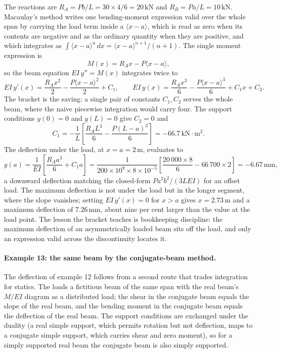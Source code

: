 The reactions are $R_A = Pb/L = 30 \times 4/6 = 20\,\text{kN}$ and
$R_B = Pa/L = 10\,\text{kN}$. Macaulay's method writes one bending-moment
expression valid over the whole span by carrying the load term inside a
 $\langle x - a\rangle$, which is read as zero
when its contents are negative and as the ordinary quantity when they are
positive, and which integrates as $\int \langle x - a\rangle^n\,dx =
\langle x - a\rangle^{n+1}/(n+1)$. The single moment expression is
\[
M(x) = R_A x - P\langle x - a\rangle,
\]
so the beam equation $EI\,y'' = M(x)$ integrates twice to
\[
EI\,y'(x) = \frac{R_A x^2}{2} - \frac{P\langle x - a\rangle^2}{2} + C_1,
\qquad
EI\,y(x) = \frac{R_A x^3}{6} - \frac{P\langle x - a\rangle^3}{6}
+ C_1 x + C_2.
\]
The bracket is the saving: a single pair of constants $C_1, C_2$ serves
the whole beam, where the naive piecewise integration would carry four.
The support conditions $y(0) = 0$ and $y(L) = 0$ give $C_2 = 0$ and
\[
C_1 = -\frac{1}{L}\left[\frac{R_A L^3}{6} - \frac{P(L - a)^3}{6}\right]
= -66.7\,\text{kN}\cdot\si{\meter\squared}.
\]
The deflection under the load, at $x = a = 2\,\si{\meter}$, evaluates to
\[
y(a) = \frac{1}{EI}\left[\frac{R_A a^3}{6} + C_1 a\right]
= \frac{1}{200 \times 10^9 \times 8\times 10^{-5}}
\left[\frac{20\,000 \times 8}{6} - 66\,700 \times 2\right]
= -6.67\,\si{\milli\meter},
\]
a downward deflection matching the closed-form $Pa^2b^2/(3LEI)$ for an
offset load. The maximum deflection is not under the load but in the
longer segment, where the slope vanishes; setting $EI\,y'(x) = 0$ for
$x > a$ gives $x = 2.73\,\si{\meter}$ and a maximum deflection of
$7.26\,\si{\milli\meter}$, about nine per cent larger than the value at
the load point. The lesson the bracket teaches is bookkeeping discipline:
the maximum deflection of an asymmetrically loaded beam sits off the
load, and only an expression valid across the discontinuity locates it.

\paragraph{Example 13: the same beam by the conjugate-beam method.} The
deflection of example 12 follows from a second route that trades
integration for statics. The  loads a
fictitious beam of the same span with the real beam's $M/EI$ diagram as a
distributed load; the shear in the conjugate beam equals the slope of the
real beam, and the bending moment in the conjugate beam equals the
deflection of the real beam. The support conditions are exchanged under
the duality (a real simple support, which permits rotation but not
deflection, maps to a conjugate simple support, which carries shear and
zero moment), so for a simply supported real beam the conjugate beam is
also simply supported.

